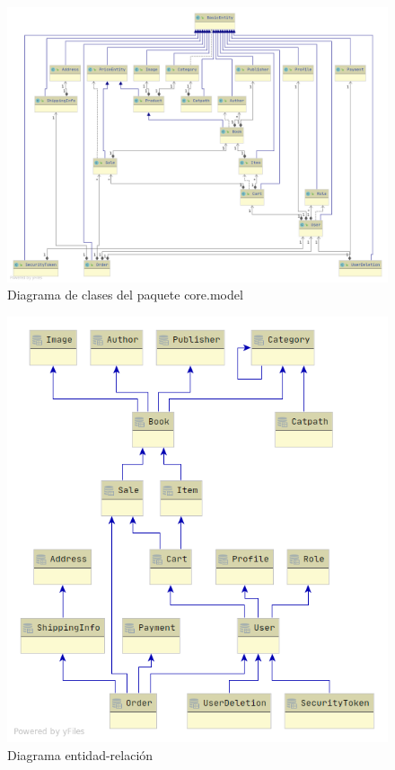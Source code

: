 \documentclass[a4paper,12pt,twoside,openright]{report}
\begin{document}
    \begin{figure}[htb!]
    	\centering
    	\includegraphics[height=\textwidth,angle=90,origin=c]{package_model}
    	\caption{Diagrama de clases del paquete core.model}
    	\label{fig:package_model}
    \end{figure}

	\begin{figure}[htb!]
		\centering
		\includegraphics[width=\textwidth,keepaspectratio]{er_simple_diagram}
		\caption{Diagrama entidad-relación}
		\label{fig:er_simple_diagram}
	\end{figure}
\end{document}
